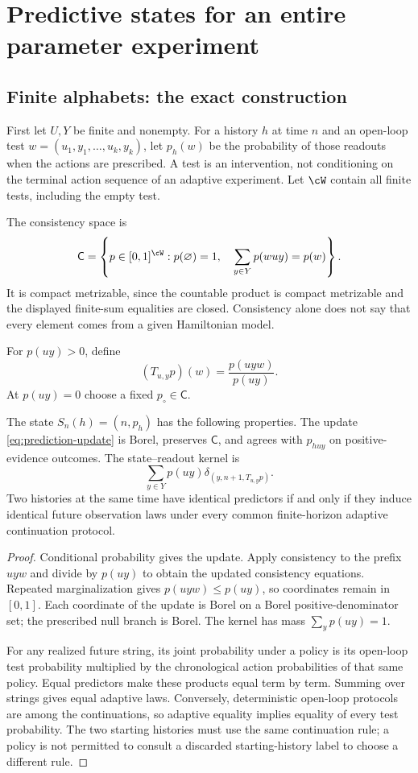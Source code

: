 \section{Predictive states for an entire parameter experiment}\label{sec:predictors}
\subsection{Finite alphabets: the exact construction}
First let $U,Y$ be finite and nonempty. For a history $h$ at time $n$ and an open-loop test
$w=(u_1,y_1,\ldots,u_k,y_k)$, let $p_h(w)$ be the probability of those readouts when the actions are prescribed. A test is an intervention, not conditioning on the terminal action sequence of an adaptive experiment. Let $\cW$ contain all finite tests, including the empty test.

The consistency space is
\[
 \mathsf C=\left\{p\in[0,1]^{\cW}:p(\varnothing)=1,\quad
 \sum_{y\in Y}p(wuy)=p(w)\right\}.
\]
It is compact metrizable, since the countable product is compact metrizable and the displayed finite-sum equalities are closed. Consistency alone does not say that every element comes from a given Hamiltonian model.

For $p(uy)>0$, define
\begin{equation}
 (T_{u,y}p)(w)=\frac{p(uyw)}{p(uy)}.
 \label{eq:prediction-update}
\end{equation}
At $p(uy)=0$ choose a fixed $p_\circ\in\mathsf C$.

\begin{theorem}\label{thm:finite-state}
The state $S_n(h)=(n,p_h)$ has the following properties.
The update \eqref{eq:prediction-update} is Borel, preserves $\mathsf C$, and agrees with $p_{huy}$ on positive-evidence outcomes. The state--readout kernel is
\[
 \sum_{y\in Y}p(uy)\delta_{(y,n+1,T_{u,y}p)}.
\]
Two histories at the same time have identical predictors if and only if they induce identical future observation laws under every common finite-horizon adaptive continuation protocol.
\end{theorem}
\begin{proof}
Conditional probability gives the update. Apply consistency to the prefix $uyw$ and divide by $p(uy)$ to obtain the updated consistency equations. Repeated marginalization gives $p(uyw)\le p(uy)$, so coordinates remain in $[0,1]$. Each coordinate of the update is Borel on a Borel positive-denominator set; the prescribed null branch is Borel. The kernel has mass $\sum_yp(uy)=1$.

For any realized future string, its joint probability under a policy is its open-loop test probability multiplied by the chronological action probabilities of that same policy. Equal predictors make these products equal term by term. Summing over strings gives equal adaptive laws. Conversely, deterministic open-loop protocols are among the continuations, so adaptive equality implies equality of every test probability. The two starting histories must use the same continuation rule; a policy is not permitted to consult a discarded starting-history label to choose a different rule.
\end{proof}


